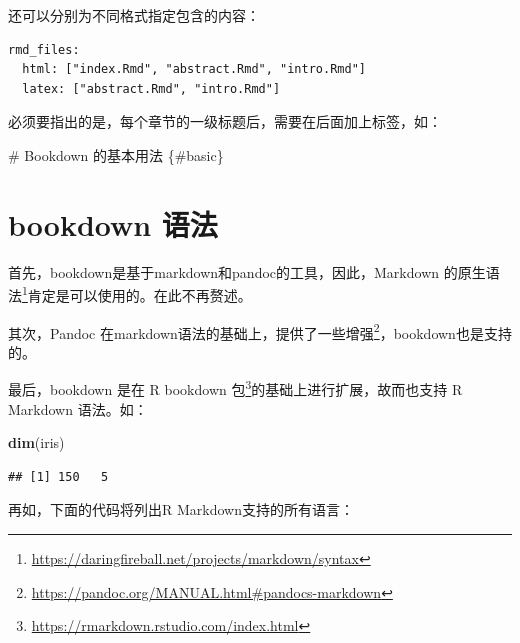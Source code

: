 \documentclass[]{ctexbook}
\newenvironment{Shaded}{\begin{snugshade}}{\end{snugshade}}
\newcommand{\FunctionTok}[1]{\textcolor[rgb]{0.00,0.00,0.00}{#1}}
\newcommand{\KeywordTok}[1]{\textcolor[rgb]{0.13,0.29,0.53}{\textbf{#1}}}
\newcommand{\NormalTok}[1]{#1}
\newcommand{\OperatorTok}[1]{\textcolor[rgb]{0.81,0.36,0.00}{\textbf{#1}}}
\renewcommand{\href}[2]{#2\footnote{\url{#1}}}
\begin{document}
还可以分别为不同格式指定包含的内容：

\begin{verbatim}
rmd_files:
  html: ["index.Rmd", "abstract.Rmd", "intro.Rmd"]
  latex: ["abstract.Rmd", "intro.Rmd"]
\end{verbatim}

必须要指出的是，每个章节的一级标题后，需要在后面加上标签，如：

\begin{Shaded}
\begin{Highlighting}[]
\FunctionTok{# Bookdown 的基本用法 \{#basic\}}
\end{Highlighting}
\end{Shaded}

\hypertarget{bookdown-ux8bedux6cd5}{%
\section{bookdown 语法}\label{bookdown-ux8bedux6cd5}}

首先，bookdown是基于markdown和pandoc的工具，因此，\href{https://daringfireball.net/projects/markdown/syntax}{Markdown 的原生语法}肯定是可以使用的。在此不再赘述。

其次，\href{https://pandoc.org/MANUAL.html\#pandocs-markdown}{Pandoc 在markdown语法的基础上，提供了一些增强}，bookdown也是支持的。

最后，bookdown 是在 \href{https://rmarkdown.rstudio.com/index.html}{R bookdown 包}的基础上进行扩展，故而也支持 R Markdown 语法。如：

\begin{Shaded}
\begin{Highlighting}[]
\KeywordTok{dim}\NormalTok{(iris)}
\end{Highlighting}
\end{Shaded}

\begin{verbatim}
## [1] 150   5
\end{verbatim}

再如，下面的代码将列出R Markdown支持的所有语言：

\begin{Shaded}
\end{Shaded}
\end{document}
